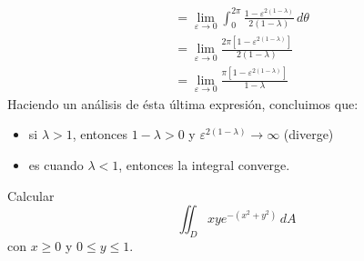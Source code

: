 \documentclass{article}
\begin{document}
\begin{enumerate}
{{\begin{align*}
                &=\lim_{\varepsilon\to 0}{
                    \int_{0}^{2\pi}{
                        \frac{1-\varepsilon^{2(1-\lambda)}}
                             {2(1-\lambda)}
                    \,d\theta}
                }\\[.2cm]
                &=\lim_{\varepsilon\to 0}{
                    \frac{2\pi[1-\varepsilon^{2(1-\lambda)}]}
                         {2(1-\lambda)}
                }\\[.2cm]
                &=\lim_{\varepsilon\to 0}{
                    \frac{\pi[1-\varepsilon^{2(1-\lambda)}]}
                         {1-\lambda}
                }
            \end{align*}
            Haciendo un análisis de ésta última expresión, concluimos que:
            \begin{itemize}
                \item si $\lambda>1$, entonces $1-\lambda>0$ y
                    $\varepsilon^{2(1-\lambda)}\to\infty$ (diverge)
                \item es cuando $\lambda<1$, entonces la integral converge.
            \end{itemize}
            
        }

        \item {
            Calcular
            \[
                \iint_D {xye^{-\left(x^2+y^2\right)}\,dA}
            \]
            con $x\geq 0$ y $0\leq y\leq 1$.

}}
\end{enumerate}
\end{document}
